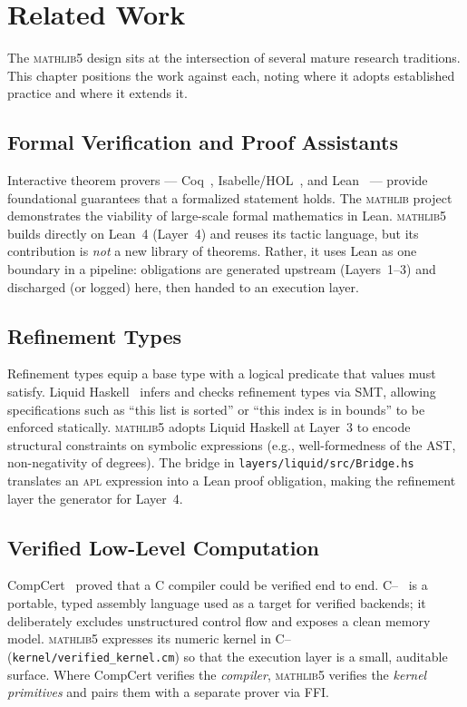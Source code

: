 \chapter{Related Work}
\label{ch:related}

The \textsc{mathlib5} design sits at the intersection of several mature
research traditions. This chapter positions the work against each, noting
where it adopts established practice and where it extends it.

\section{Formal Verification and Proof Assistants}
\label{sec:rw-provers}

Interactive theorem provers --- Coq~\cite{coq}, Isabelle/HOL~\cite{isabelle},
and Lean~\cite{lean4} --- provide foundational guarantees that a formalized
statement holds. The \textsc{mathlib} project~\cite{mathlib} demonstrates the
viability of large-scale formal mathematics in Lean. \textsc{mathlib5} builds
directly on Lean~4 (Layer~4) and reuses its tactic language, but its
contribution is \emph{not} a new library of theorems. Rather, it uses Lean as
one boundary in a pipeline: obligations are generated upstream (Layers~1--3)
and discharged (or logged) here, then handed to an execution layer.

\section{Refinement Types}
\label{sec:rw-refinement}

Refinement types equip a base type with a logical predicate that values must
satisfy. Liquid Haskell~\cite{liquidhaskell} infers and checks refinement
types via SMT, allowing specifications such as ``this list is sorted'' or
``this index is in bounds'' to be enforced statically. \textsc{mathlib5}
adopts Liquid Haskell at Layer~3 to encode structural constraints on symbolic
expressions (e.g., well-formedness of the AST, non-negativity of degrees). The
bridge in \texttt{layers/liquid/src/Bridge.hs} translates an \textsc{apl}
expression into a Lean proof obligation, making the refinement layer the
generator for Layer~4.

\section{Verified Low-Level Computation}
\label{sec:rw-cmm}

CompCert~\cite{compcert} proved that a C compiler could be verified end to
end. C{--}~\cite{cmm} is a portable, typed assembly language used as a target
for verified backends; it deliberately excludes unstructured control flow and
exposes a clean memory model. \textsc{mathlib5} expresses its numeric kernel
in C{--} (\texttt{kernel/verified\_kernel.cm}) so that the execution layer is
a small, auditable surface. Where CompCert verifies the \emph{compiler},
\textsc{mathlib5} verifies the \emph{kernel primitives} and pairs them with a
separate prover via FFI.

